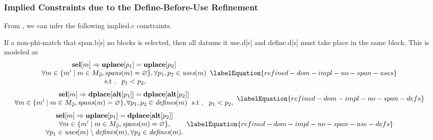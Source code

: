\subsubsection{%
  Implied Constraints due to the Define-Before-Use Refinement%
}

From , we can infer the
following \gls{implied.c} \glspl{constraint}.

If a non-\gls{phi-match} that \gls{span.b}[s] no \glspl{block} is selected, then
all \glspl{datum} it \gls{use.d}[s] and \gls{define.d}[s] must take place in the
same \gls{block}.
%
This is modeled as
%
\begin{equation}
  \begin{array}{c}
    \mVar{sel}[m] \mImp \mVar{uplace}[p_1] = \mVar{uplace}[p_2] \\
    \forall m \in
      \mSetBuilder{m'}%
                  {%
                    m \in \mPhiMatchCompSet \hspace{-1pt},
                    \mSpans(m) = \mEmptySet
                  },
    \forall p_1, p_2 \in \mUses(m) \\
    \text{\st } p_1 < p_2,
  \end{array}
  \labelEquation{refined-dom-impl-no-span-uses}
\end{equation}
%
\begin{equation}
  \begin{array}{c}
    \mVar{sel}[m]
    \mImp
    \mVar{dplace}[\mVar{alt}[p_1]] = \mVar{dplace}[\mVar{alt}[p_2]] \\
    \forall m \in
      \mSetBuilder{m'}%
                  {%
                    m \in \mPhiMatchCompSet \hspace{-1pt},
                    \mSpans(m) = \mEmptySet
                  },
    \forall p_1, p_2 \in \mDefines(m) \text{ \st } p_1 < p_2,
  \end{array}
  \labelEquation{refined-dom-impl-no-span-defs}
\end{equation}
%
\begin{equation}
  \begin{array}{c}
    \mVar{sel}[m]
    \mImp
    \mVar{uplace}[p_1] = \mVar{dplace}[\mVar{alt}[p_2]] \\
    \forall m \in
      \mSetBuilder{m'}%
                  {%
                    m \in \mPhiMatchCompSet \hspace{-1pt},
                    \mSpans(m) = \mEmptySet
                  }, \\
    \forall p_1 \in \mUses(m) \setminus \mDefines(m),
    \forall p_2 \in \mDefines(m).
  \end{array}
  \labelEquation{refined-dom-impl-no-span-use-defs}
\end{equation}

